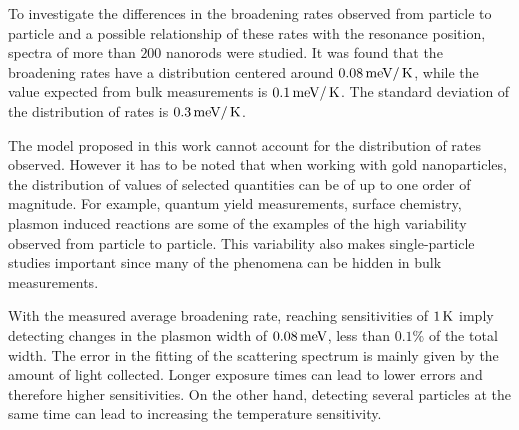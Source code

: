 To investigate the differences in the broadening rates observed from particle to
particle and a possible relationship of these rates with the resonance position,
spectra of more than $200$ nanorods were studied. It was found that the
broadening rates have a distribution centered around $0.08\,\textrm{meV}/\,\textrm{K}$, while the
value expected from bulk measurements is $0.1\,\textrm{meV}/\,\textrm{K}$\cite{McKay1976}. The
standard deviation of the distribution of rates is $0.3\,\textrm{meV}/\,\textrm{K}$.

The model proposed in this work cannot account for the distribution of rates
observed. However it has to be noted that when working with gold nanoparticles,
the distribution of values of selected quantities can be of up to one order of
magnitude. For example, quantum yield measurements\cite{Yorulmaz2012}, surface
chemistry\cite{Carattino2016}, plasmon induced reactions\cite{Osinkina2013} are
some of the examples of the high variability observed from particle to particle.
This variability also makes single-particle studies important since many of the
phenomena can be hidden in bulk measurements\cite{Link1999b}.

With the measured average broadening rate, reaching sensitivities of $1\,\textrm{K}$ imply
detecting changes in the plasmon width of $0.08\,\textrm{meV}$, less than $0.1\%$ of the
total width. The error in the fitting of the scattering spectrum is mainly given
by the amount of light collected. Longer exposure times can lead to lower errors
and therefore higher sensitivities. On the other hand, detecting several
particles at the same time can lead to increasing the temperature sensitivity.

